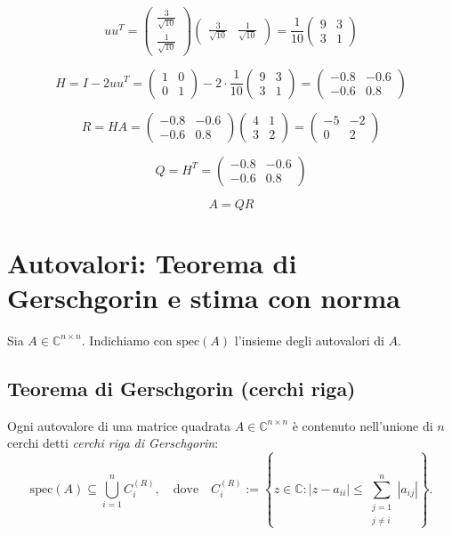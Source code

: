 \documentclass[12pt,a4paper]{article}
\begin{document}
\[
u u^T = \begin{pmatrix} \frac{3}{\sqrt{10}} \\ \frac{1}{\sqrt{10}} \end{pmatrix} \begin{pmatrix} \frac{3}{\sqrt{10}} & \frac{1}{\sqrt{10}} \end{pmatrix} = \frac{1}{10} \begin{pmatrix}9 & 3 \\ 3 & 1 \end{pmatrix}
\]

\[
H = I - 2 u u^T = \begin{pmatrix}1 & 0 \\ 0 & 1\end{pmatrix} - 2 \cdot \frac{1}{10} \begin{pmatrix}9 & 3 \\ 3 & 1\end{pmatrix} = \begin{pmatrix} -0.8 & -0.6 \\ -0.6 & 0.8 \end{pmatrix}
\]

\[
R = H A = \begin{pmatrix} -0.8 & -0.6 \\ -0.6 & 0.8 \end{pmatrix} \begin{pmatrix}4 & 1 \\ 3 & 2 \end{pmatrix} = \begin{pmatrix} -5 & -2 \\ 0 & 2 \end{pmatrix}
\]

\[
Q = H^T = \begin{pmatrix} -0.8 & -0.6 \\ -0.6 & 0.8 \end{pmatrix}
\]

\[
A = Q R
\]

\newpage
\section*{Autovalori: Teorema di Gerschgorin e stima con norma}

Sia \( A \in \mathbb{C}^{n \times n} \). Indichiamo con \( \mathrm{spec}(A) \) l'insieme degli autovalori di \( A \).

\subsection*{Teorema di Gerschgorin (cerchi riga)}
Ogni autovalore di una matrice quadrata \( A \in \mathbb{C}^{n \times n} \) è contenuto nell’unione di \( n \) cerchi detti \emph{cerchi riga di Gerschgorin}:
\[
\mathrm{spec}(A) \subseteq \bigcup_{i=1}^n C_i^{(R)}, \quad \text{dove} \quad 
C_i^{(R)} := \left\{ z \in \mathbb{C} : |z - a_{ii}| \leq \sum_{\substack{j=1 \\ j \neq i}}^n |a_{ij}| \right\}.
\]
\end{document}
